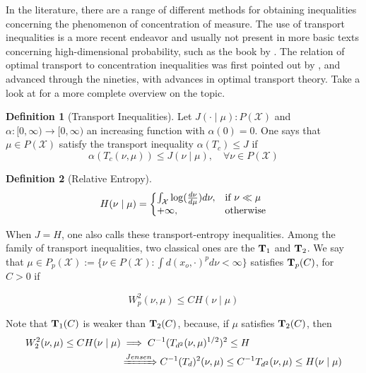 \documentclass[10pt]{article}
\theoremstyle{definition}
\newtheorem{definition}{Definition}[section]
\begin{document}
In the literature, there are a range of different methods for obtaining inequalities
concerning the phenomenon of concentration of measure. The use of transport inequalities
is a more recent endeavor and usually not present in more basic texts concerning
high-dimensional probability, such as the book by \citet{vershynin2018high}.
The relation of optimal transport to concentration inequalities was first pointed out by \citet{marton1986simple},  and advanced through the nineties, with advances in optimal
transport theory. Take a look at \citet{gozlan2010transport} for a more complete overview
on the topic.

\begin{definition}[Transport Inequalities]
	Let $J(\cdot \mid \mu): P(\mathcal X)$ and
	$\alpha:[0,\infty) \rightarrow [0,\infty)$ an increasing function with $\alpha(0)=0$.
	One says that $\mu \in P(\mathcal X)$ satisfy the transport inequality
	$\alpha(T_c) \leq J$ if
	$$
	\alpha(T_c(\nu,\mu)) \leq J(\nu \mid \mu) , \quad \forall \nu \in P(\mathcal X)
	$$
\end{definition}
\begin{definition}[Relative Entropy]
$$
	H(\nu \mid \mu) =
	\left\{
	  \begin{array}{@{}ll@{}}
	    \int_\mathcal X \log(\frac{d\nu}{d\mu})d\nu, & \text{if}\ \nu \ll\mu \\
	    +\infty, & \text{otherwise}
	  \end{array}\right.
$$
\end{definition}

When $J  = H$, one also calls these transport-entropy inequalities. Among the family
of transport inequalities, two classical ones are the $\textbf T_1$ and $\textbf T_2$. We
say that $\mu \in P_p(\mathcal X)
:= \{ \nu \in P(\mathcal X): \int d(x_o, \cdot)^p d\nu < \infty\}$ satisfies
$\textbf T_p(C)$, for $C > 0$ if

\begin{equation}
	W_p^2(\nu,\mu) \leq C H(\nu \mid \mu)
\end{equation}

Note that $\textbf T_1(C)$ is weaker than $\textbf T_2(C)$, because, if $\mu$ satisfies
$\textbf T_2(C)$, then
\begin{align*}
W_2^2(\nu,\mu) \leq C H(\nu \mid \mu) &\implies C^{-1}(T_{d^2}(\nu,\mu)^{1/2})^2 \leq H
\\
&\xRightarrow{Jensen}
C^{-1}(T_{d})^2(\nu,\mu) \leq 
C^{-1}T_{d^2}(\nu,\mu) \leq H(\nu \mid \mu)
\end{align*}
$$
$$


  
  
\end{document}

